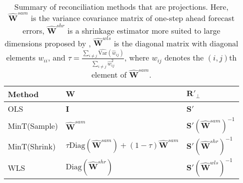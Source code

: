 \documentclass[a4paper, 11pt]{article}
\def\var{\text{Var}}
\theoremstyle{definition}
\begin{document}
\begin{table}[!h]
	\caption{Summary of reconciliation methods that are projections. Here, $\hat{\bm{W}}^{sam}$ is the variance covariance matrix of one-step ahead forecast errors, $\hat{\bm{W}}^{shr}$ is a shrinkage estimator more suited to large dimensions proposed by \citet{Schafer2005}, $\hat{\bm{W}}^{wls}$ is the diagonal matrix with diagonal elements $w_{ii}$, and $\tau = \frac{\sum_{i \neq j}\hat{\var}(\hat{w}_{ij})}{\sum_{i \neq j}{\hat{w}}^2_{ij}}$, where $w_{ij}$ denotes the $(i,j)$th element of $\hat{\bm{W}}^{sam}$.}\label{table:2}
	\centering{}
	\begin{tabular}{lll}
		\toprule
		\textbf{Method} & \textbf{$\bm{W}$} & \textbf{ $\bm{R}'_\bot$}      \\
		\midrule
		OLS             &
		$\bm{I}$  &
		$\bm{S}'$  \\
		MinT(Sample)    &
		$\hat{\bm{W}}^{sam}$ &
		$\bm{S}'(\hat{\bm{W}}^{sam})^{-1}$ \\
		MinT(Shrink)    &
		$\tau\text{Diag}(\hat{\bm{W}}^{sam}) + (1-\tau)\hat{\bm{W}}^{sam}$ &
		$\bm{S}'(\hat{\bm{W}}^{shr})^{-1}$ \\
		WLS       &
		$\text{Diag}(\hat{\bm{W}}^{shr})$ &
		$\bm{S}'(\hat{\bm{W}}^{wls})^{-1}$ \\
		\bottomrule
	\end{tabular}
\end{table}

%

\end{document}
